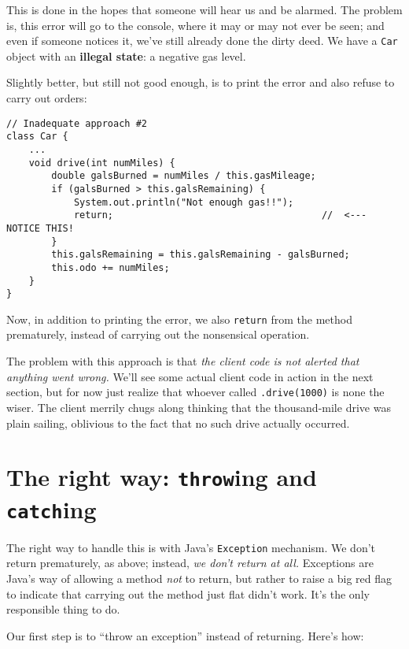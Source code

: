 This is done in the hopes that someone will hear us and be alarmed. The
problem is, this error will go to the console, where it may or may not ever be
seen; and even if someone notices it, we've still already done the dirty deed.
We have a \texttt{Car} object with an \textbf{illegal state}: a negative gas
level.

Slightly better, but still not good enough, is to print the error and also
refuse to carry out orders:

\begin{Verbatim}[samepage=true,fontsize=\footnotesize,frame=single]
// Inadequate approach #2
class Car {
    ...
    void drive(int numMiles) {
        double galsBurned = numMiles / this.gasMileage;
        if (galsBurned > this.galsRemaining) {
            System.out.println("Not enough gas!!");
            return;                                     //  <---  NOTICE THIS!
        }
        this.galsRemaining = this.galsRemaining - galsBurned;
        this.odo += numMiles;
    }
}
\end{Verbatim}

Now, in addition to printing the error, we also \texttt{return} from the
method prematurely, instead of carrying out the nonsensical operation.

The problem with this approach is that \textit{the client code is not alerted
that anything went wrong.} We'll see some actual client code in action in the
next section, but for now just realize that whoever called
\texttt{.drive(1000)} is none the wiser. The client merrily chugs along
thinking that the thousand-mile drive was plain sailing, oblivious to the fact
that no such drive actually occurred.

\section{The right way: \texttt{throw}ing and \texttt{catch}ing}

The right way to handle this is with Java's \texttt{Exception} mechanism. We
don't return prematurely, as above; instead, \textit{we don't return at all.}
Exceptions are Java's way of allowing a method \textit{not} to return, but
rather to raise a big red flag to indicate that carrying out the method just
flat didn't work. It's the only responsible thing to do.

Our first step is to ``throw an exception'' instead of returning. Here's how:


